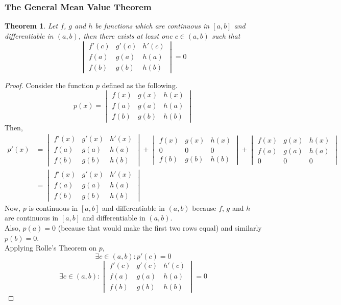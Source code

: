 \documentclass[14]{article}
\newtheorem{theorem}{Theorem}
\theoremstyle{definition}
\theoremstyle{case}
\begin{document}
\subsubsection{The General Mean Value Theorem}
\begin{theorem}
Let $f$, $g$ and $h$ be functions which are continuous in $[a, b]$ and differentiable in $(a, b)$, then there exists at least one $c \in (a, b)$ such that
\[
\begin{vmatrix}
f'(c) & g'(c) & h'(c)\\
f(a) & g(a) & h(a)\\
f(b) & g(b) & h(b)
\end{vmatrix} = 0
\]
\end{theorem}
\begin{proof}
Consider the function $p$ defined as the following.
\[p(x) = 
\begin{vmatrix}
f(x) & g(x) & h(x)\\
f(a) & g(a) & h(a)\\
f(b) & g(b) & h(b)
\end{vmatrix}
\]
Then,
\begin{align*}
p'(x) &= 
\begin{vmatrix}
f'(x) & g'(x) & h'(x)\\
f(a) & g(a) & h(a)\\
f(b) & g(b) & h(b)
\end{vmatrix}
+
\begin{vmatrix}
f(x) & g(x) & h(x)\\
0 & 0 & 0\\
f(b) & g(b) & h(b)
\end{vmatrix}
+
\begin{vmatrix}
f(x) & g(x) & h(x)\\
f(a) & g(a) & h(a)\\
0 & 0 & 0
\end{vmatrix}\\
&=
\begin{vmatrix}
f'(x) & g'(x) & h'(x)\\
f(a) & g(a) & h(a)\\
f(b) & g(b) & h(b)
\end{vmatrix}
\end{align*}
Now, $p$ is continuous in $[a, b]$ and differentiable in $(a, b)$ because $f$, $g$ and $h$ are continuous in $[a, b]$ and differentiable in $(a, b)$.\\
Also, $p(a) = 0$ (because that would make the first two rows equal) and similarly $p(b) = 0$.\\
Applying Rolle's Theorem on $p$,
\[\exists c \in (a, b) : p'(c) = 0\]
\[\exists c \in (a, b) :
\begin{vmatrix}
f'(c) & g'(c) & h'(c)\\
f(a) & g(a) & h(a)\\
f(b) & g(b) & h(b)
\end{vmatrix} = 0
 \]
\end{proof}
\pagebreak
\end{document}
